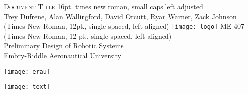 \begin{titlepage}
\flushleft
\doublespacing
\Large
\textsc{Document Title} \normalsize\color{red} 16pt. times new roman, small caps left adjusted\color{black}\\
\normalsize
Trey Dufrene, Alan Wallingford, David Orcutt, Ryan Warner, Zack Johnson \color{red} (Times New Roman, 12pt., single-spaced, left aligned) \color{black}
\vfill
\center
\texttt{[image: logo]}
\vfill
\flushleft
ME 407 \color{red} (Times New Roman, 12 pt., single-spaced, left aligned) \color{black}\\
Preliminary Design of Robotic Systems \\
Embry-Riddle Aeronautical University \\
\vspace{2ex}
\begin{minipage}[c]{.5\textwidth}
\flushleft
\texttt{[image: erau]}
\end{minipage}%
\begin{minipage}[c]{.5\textwidth}
\flushright
\texttt{[image: text]}
\end{minipage}
\end{titlepage}
